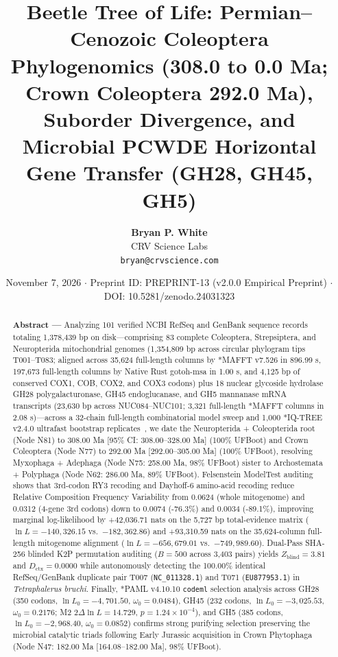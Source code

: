 \documentclass[10pt,letterpaper]{article}
\title{\textbf{Beetle Tree of Life: Permian--Cenozoic Coleoptera Phylogenomics (308.0 to 0.0 Ma; Crown Coleoptera 292.0 Ma), Suborder Divergence, and Microbial PCWDE Horizontal Gene Transfer (GH28, GH45, GH5)}}
\author{\textbf{Bryan P. White} \\ CRV Science Labs \\ \texttt{bryan@crvscience.com}}
\date{November 7, 2026 \quad $\cdot$ \quad Preprint ID: PREPRINT-13 (v2.0.0 Empirical Preprint) \quad $\cdot$ \quad DOI: 10.5281/zenodo.24031323}
\begin{document}
\maketitle

\begin{abstract}
\noindent \textbf{Abstract ---} Analyzing 101 verified NCBI RefSeq and GenBank sequence records totaling 1,378,439 bp on disk---comprising 83 complete Coleoptera, Strepsiptera, and Neuropterida mitochondrial genomes (1,354,809 bp across circular phylogram tips T001--T083; aligned across 35,624 full-length columns by *MAFFT v7.526 in 896.99 s, 197,673 full-length columns by Native Rust gotoh-msa in 1.00 s, and 4,125 bp of conserved COX1, COB, COX2, and COX3 codons) plus 18 nuclear glycoside hydrolase GH28 polygalacturonase, GH45 endoglucanase, and GH5 mannanase mRNA transcripts (23,630 bp across NUC084--NUC101; 3,321 full-length *MAFFT columns in 2.08 s)---across a 32-chain full-length combinatorial model sweep and 1,000 *IQ-TREE v2.4.0 ultrafast bootstrap replicates~\cite{White2026RuNIE,McKenna2019,Kirsch2014}, we date the Neuropterida + Coleopterida root (Node N81) to 308.00 Ma [95\% CI: 308.00--328.00 Ma] (100\% UFBoot) and Crown Coleoptera (Node N77) to 292.00 Ma [292.00--305.00 Ma] (100\% UFBoot), resolving Myxophaga + Adephaga (Node N75: 258.00 Ma, 98\% UFBoot) sister to Archostemata + Polyphaga (Node N62: 286.00 Ma, 89\% UFBoot). Felsenstein ModelTest auditing shows that 3rd-codon RY3 recoding and Dayhoff-6 amino-acid recoding reduce Relative Composition Frequency Variability from 0.0624 (whole mitogenome) and 0.0312 (4-gene 3rd codons) down to 0.0074 (-76.3\%) and 0.0034 (-89.1\%), improving marginal log-likelihood by +42,036.71 nats on the 5,727 bp total-evidence matrix ($\ln L = -140,326.15$ vs.\ $-182,362.86$) and +93,310.59 nats on the 35,624-column full-length mitogenome alignment ($\ln L = -656,679.01$ vs.\ $-749,989.60$). Dual-Pass SHA-256 blinded K2P permutation auditing ($B = 500$ across 3,403 pairs) yields $Z_{\text{blind}} = 3.81$ and $D_{\text{ctx}} = 0.0000$ while autonomously detecting the 100.00\% identical RefSeq/GenBank duplicate pair T007 (\texttt{NC\_011328.1}) and T071 (\texttt{EU877953.1}) in \textit{Tetraphalerus bruchi}. Finally, *PAML v4.10.10 \texttt{codeml} selection analysis across GH28 (350 codons, $\ln L_0 = -4,701.50$, $\omega_0 = 0.0484$), GH45 (232 codons, $\ln L_0 = -3,025.53$, $\omega_0 = 0.2176$; M2 $2\Delta\ln L = 14.729$, $p = 1.24 \times 10^{-4}$), and GH5 (385 codons, $\ln L_0 = -2,968.40$, $\omega_0 = 0.0852$) confirms strong purifying selection preserving the microbial catalytic triads following Early Jurassic acquisition in Crown Phytophaga (Node N47: 182.00 Ma [164.08--182.00 Ma], 98\% UFBoot).
\end{abstract}
\end{document}

